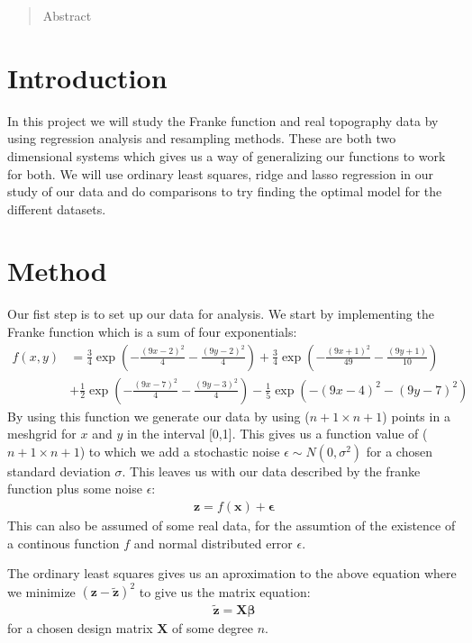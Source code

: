 \documentclass[norsk,a4paper,11pt]{scrartcl}
\title{}
\author{}
\date{\today}
\begin{document}
\maketitle
\begin{abstract}
  Abstract
\end{abstract}
\tableofcontents
\section{Introduction}
In this project we will study the Franke function and real topography data by using regression analysis and resampling methods. These are both two dimensional systems which gives us a way of generalizing our functions to work for both. We will use ordinary least squares, ridge and lasso regression in our study of our data and do comparisons to try finding the optimal model for the different datasets.
\section{Method}
Our fist step is to set up our data for analysis. We start by implementing the Franke function which is a sum of four exponentials:
\begin{align*}
  f(x,y) &= \frac{3}{4 }\exp\left(- \frac{(9x -2 )^2}{4} - \frac{(9y-2)^2}{4}\right) +\frac{3}{4}\exp{\left(-\frac{(9x+1)^2}{49}- \frac{(9y+1)}{10}\right)} \\
&+\frac{1}{2}\exp{\left(-\frac{(9x-7)^2}{4} - \frac{(9y-3)^2}{4}\right)} -\frac{1}{5}\exp{\left( -(9x-4)^2 - (9y-7)^2\right) }
\end{align*}
By using this function we generate our data by using ($n+1\times n+1$) points in a meshgrid for $x$ and $y$ in the interval [0,1]. This gives us a function value of ($n+1 \times n+1$) to which we add a stochastic noise $\epsilon \sim N(0,\sigma^2)$ for a chosen standard deviation $\sigma$. This leaves us with our data described by the franke function plus some noise $\epsilon$:
\begin{align*}
  \boldsymbol{z} = f(\boldsymbol{x}) + \boldsymbol{\epsilon}
\end{align*}
This can also be assumed of some real data, for the assumtion of the existence of a continous function $f$ and normal distributed error $\epsilon$.

The ordinary least squares gives us an aproximation to the above equation where we minimize $(\boldsymbol{z} - \boldsymbol{\tilde{z}})^2$ to give us the matrix equation:
\begin{align*}
  \boldsymbol{\tilde{z}} = \boldsymbol{X}\boldsymbol{\beta}
\end{align*}
for a chosen design matrix $\boldsymbol{X}$ of some degree $n$.
\end{document}
